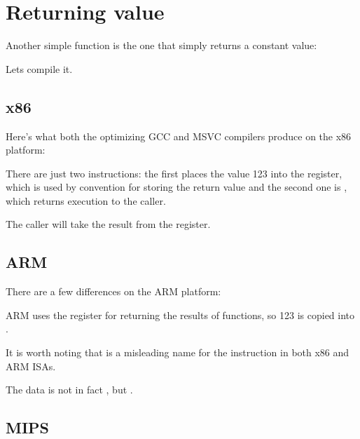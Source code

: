 \section{Returning value}
\label{ret_val_func}

Another simple function is the one that simply returns a constant value:



Lets compile it.

\subsection{x86}

Here's what both the optimizing GCC and MSVC compilers produce on the x86 platform:



There are just two instructions: the first places the value 123 into the \EAX register, 
which is used by convention for storing the return
value and the second one is \RET, which returns execution to the \gls{caller}.

The caller will take the result from the \EAX register.

\subsection{ARM}

There are a few differences on the ARM platform:



ARM uses the register  for returning the results of functions, so 123 is copied into .

It is worth noting that \MOV is a misleading name for the instruction in both x86 and ARM \ac{ISA}s.

The data is not in fact , but .

\subsection{MIPS}

\label{MIPS_leaf_function_ex1}

